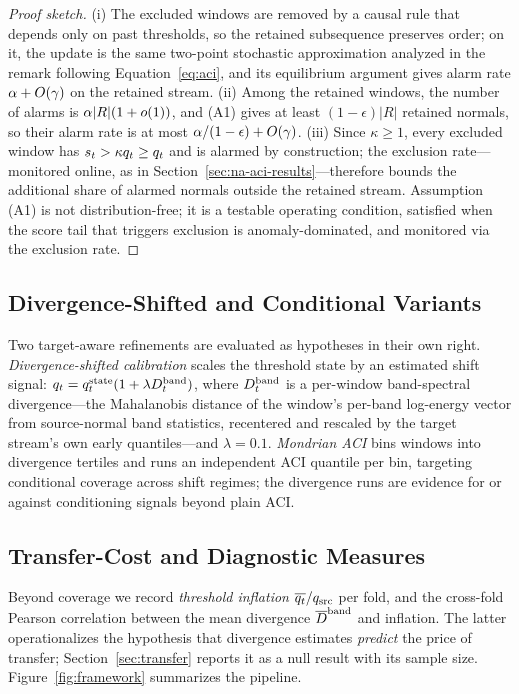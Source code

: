 \begin{proof}[Proof sketch]
(i) The excluded windows are removed by a causal rule that depends only on past thresholds, so the retained subsequence preserves order; on it, the update is the same two-point stochastic approximation analyzed in the remark following Equation~\ref{eq:aci}, and its equilibrium argument gives alarm rate $\alpha+O(\gamma)$ on the retained stream. (ii) Among the retained windows, the number of alarms is $\alpha|R|(1+o(1))$, and (A1) gives at least $(1-\epsilon)|R|$ retained normals, so their alarm rate is at most $\alpha/(1-\epsilon)+O(\gamma)$. (iii) Since $\kappa\ge1$, every excluded window has $s_t>\kappa q_t\ge q_t$ and is alarmed by construction; the exclusion rate---monitored online, as in Section~\ref{sec:na-aci-results}---therefore bounds the additional share of alarmed normals outside the retained stream. Assumption (A1) is not distribution-free; it is a testable operating condition, satisfied when the score tail that triggers exclusion is anomaly-dominated, and monitored via the exclusion rate.
\end{proof}


\subsection{Divergence-Shifted and Conditional Variants}
Two target-aware refinements are evaluated as hypotheses in their own right. \emph{Divergence-shifted calibration} scales the threshold state by an estimated shift signal: $q_t = q^{\mathrm{state}}_t (1+\lambda D^{\mathrm{band}}_t)$, where $D^{\mathrm{band}}_t$ is a per-window band-spectral divergence---the Mahalanobis distance of the window's per-band log-energy vector from source-normal band statistics, recentered and rescaled by the target stream's own early quantiles---and $\lambda=0.1$. \emph{Mondrian ACI} bins windows into divergence tertiles and runs an independent ACI quantile per bin, targeting conditional coverage across shift regimes; the divergence runs are evidence for or against conditioning signals beyond plain ACI.

\subsection{Transfer-Cost and Diagnostic Measures}
Beyond coverage we record \emph{threshold inflation} $\overline{q_t}/q_{\mathrm{src}}$ per fold, and the cross-fold Pearson correlation between the mean divergence $\overline{D}^{\mathrm{band}}$ and inflation. The latter operationalizes the hypothesis that divergence estimates \emph{predict} the price of transfer; Section~\ref{sec:transfer} reports it as a null result with its sample size. Figure~\ref{fig:framework} summarizes the pipeline.

